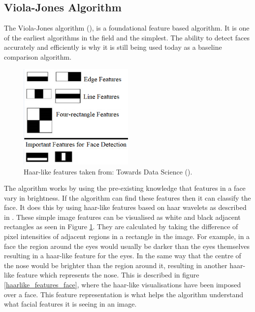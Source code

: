 \documentclass{l4proj}
\begin{document}
\subsection{Viola-Jones Algorithm}
\label{viola}
The Viola-Jones algorithm (\cite{viola}), is a foundational feature based algorithm. It is one of the earliest algorithms in the field and the simplest. The ability to detect faces accurately and efficiently is why it is still being used today as a baseline comparison algorithm.
\begin{figure}[h!]
\centering
  \begin{minipage}{\textwidth}
  \centering

    \includegraphics[width=0.5\textwidth]{images/haarlike_features.png}
    \caption{Haar-like features taken from: Towards Data Science (\cite{haarlikeimage}).}
    \label{haarlike_features}
  \end{minipage}  
\end{figure}

The algorithm works by using the pre-existing knowledge that features in a face vary in brightness. If the algorithm can find these features then it can classify the face. It does this by using haar-like features based on haar wavelets as described in \cite{haar}. These simple image features can be visualised as white and black adjacent rectangles as seen in Figure \ref{haarlike_features}. They are calculated by taking the difference of pixel intensities of adjacent regions in a rectangle in the image. For example, in a face the region around the eyes would usually be darker than the eyes themselves resulting in a haar-like feature for the eyes. In the same way that the centre of the nose would be brighter than the region around it, resulting in another haar-like feature which represents the nose. This is described in figure \ref{haarlike_features_face}, where the haar-like visualisations have been imposed over a face. This feature representation is what helps the algorithm understand what facial features it is seeing in an image.
 
\end{document}
